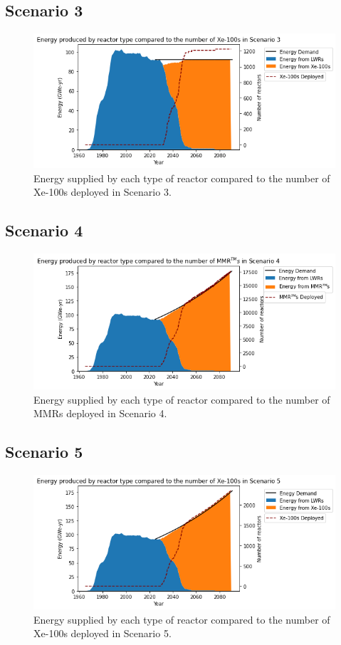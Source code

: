 \subsection{Scenario 3}

\begin{figure}
    \centering 
    \includegraphics[scale=0.5]{figures/energy_scenario3.png}
    \caption{Energy supplied by each type of reactor compared to the number of 
    Xe-100s deployed in Scenario 3.}
    \label{fig:energy_rx_3}
\end{figure}

\subsection{Scenario 4}

\begin{figure}
    \centering 
    \includegraphics[scale=0.5]{figures/energy_scenario4.png}
    \caption{Energy supplied by each type of reactor compared to the number of 
    \glspl{MMR} deployed in Scenario 4.}
    \label{fig:energy_rx_4}
\end{figure}

\subsection{Scenario 5}

\begin{figure}
    \centering 
    \includegraphics[scale=0.5]{figures/energy_scenario5.png}
    \caption{Energy supplied by each type of reactor compared to the number of 
    Xe-100s deployed in Scenario 5.}
    \label{fig:energy_rx_5}
\end{figure}
